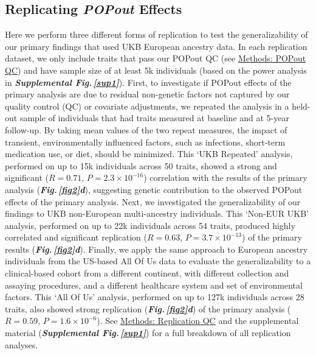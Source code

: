\documentclass[12pt]{zHenriquesLab-StyleBioRxiv}
\newcommand\dref[2]{\normalsize{\textbf{\textit{Fig.\,\ref{#1}#2}}}\normalsize{}}
\newcommand\sref[1]{\normalsize{\textbf{\textit{Supplemental Fig.\,\ref{#1}}}}\normalsize{}}
\begin{document}
\subsection*{Replicating \textit{POPout} Effects} \label{sec:res1}
Here we perform three different forms of replication to test the 
generalizability of our primary findings that used UKB European 
ancestry data. In each replication dataset, we only include traits that pass 
our POPout QC (see \hyperref[sec:methods:qc]{Methods: POPout QC}) 
and have sample size of at least 5k individuals (based on the power analysis in \sref{sup1}). 
First, to investigate if POPout effects of the primary analysis 
are due to residual non-genetic factors not captured by our 
quality control (QC) or covariate adjustments, we repeated 
the analysis in a held-out sample of individuals that had 
traits measured at baseline and at 5-year follow-up. By taking 
mean values of the two repeat measures, the impact of transient, 
environmentally influenced factors, such as infections, 
short-term medication use, or diet, should be minimized. 
This ‘UKB Repeated’ analysis, performed on up to 15k individuals 
across 50 traits, showed a strong and significant 
($R=0.71$, $P=2.3 \times 10^{-16}$) correlation with the 
results of the primary analysis (\dref{fig2}{d}), suggesting genetic 
contribution to the observed POPout effects of the primary analysis.
Next, we investigated the generalizability of our findings 
to UKB non-European multi-ancestry individuals. This ‘Non-EUR UKB’ 
analysis, performed on up to 22k individuals across 54 traits, 
produced highly correlated and significant replication 
($R=0.63$, $P=3.7 \times 10^{-13}$) of the primary 
results (\dref{fig2}{d}). 
Finally, we apply the same approach to European ancestry individuals 
from the US-based All Of Us data \cite{Bick2024} to evaluate 
the generalizability to a clinical-based cohort from a different 
continent, with different collection and assaying procedures, 
and a different healthcare system and set of environmental factors. 
This ‘All Of Us’ analysis, performed on up to 127k individuals 
across 28 traits, also showed strong replication (\dref{fig2}{d}) of 
the primary analysis ($R=0.59$, $P=1.6 \times 10^{-6}$). 
See \hyperref[sec:methods:rqc]{Methods: Replication QC} and the 
supplemental material (\sref{sup1}) for a full breakdown of all 
replication analyses. 
%
%
\end{document}

